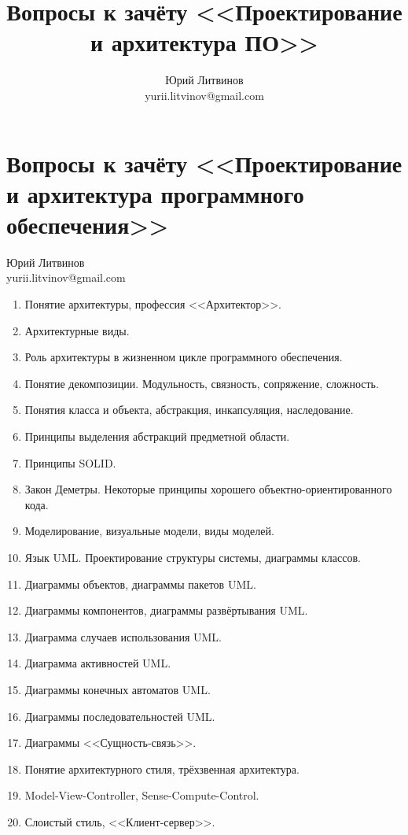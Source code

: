 \documentclass[a5paper]{article}
\title{Вопросы к зачёту <<Проектирование и архитектура ПО>>}
\author{Юрий Литвинов\\\small{yurii.litvinov@gmail.com}}
\begin{document}
\thispagestyle{empty}

\section*{Вопросы к зачёту <<Проектирование и архитектура программного обеспечения>>}

\begin{flushright}\begin{small}Юрий Литвинов\\\small{yurii.litvinov@gmail.com}\end{small}\end{flushright}

\begin{enumerate}
    \item Понятие архитектуры, профессия <<Архитектор>>.
    \item Архитектурные виды.
    \item Роль архитектуры в жизненном цикле программного обеспечения.
    \item Понятие декомпозиции. Модульность, связность, сопряжение, сложность.
    \item Понятия класса и объекта, абстракция, инкапсуляция, наследование.
    \item Принципы выделения абстракций предметной области.
    \item Принципы SOLID.
    \item Закон Деметры. Некоторые принципы хорошего объектно-ориентированного кода.
    \item Моделирование, визуальные модели, виды моделей.
    \item Язык UML. Проектирование структуры системы, диаграммы классов.
    \item Диаграммы объектов, диаграммы пакетов UML.
    \item Диаграммы компонентов, диаграммы развёртывания UML.
    \item Диаграмма случаев использования UML.
    \item Диаграмма активностей UML.
    \item Диаграммы конечных автоматов UML.
    \item Диаграммы последовательностей UML.
    \item Диаграммы <<Сущность-связь>>.
    \item Понятие архитектурного стиля, трёхзвенная архитектура.
    \item Model-View-Controller, Sense-Compute-Control.
    \item Слоистый стиль, <<Клиент-сервер>>.

\end{enumerate}
\end{document}
